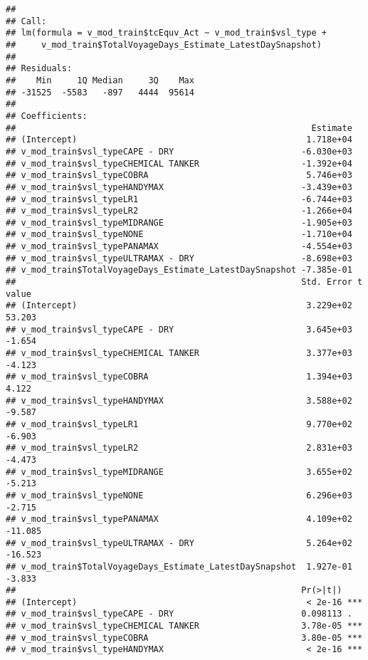 \documentclass[]{article}
\begin{document}
\begin{verbatim}
## 
## Call:
## lm(formula = v_mod_train$tcEquv_Act ~ v_mod_train$vsl_type + 
##     v_mod_train$TotalVoyageDays_Estimate_LatestDaySnapshot)
## 
## Residuals:
##    Min     1Q Median     3Q    Max 
## -31525  -5583   -897   4444  95614 
## 
## Coefficients:
##                                                          Estimate
## (Intercept)                                             1.718e+04
## v_mod_train$vsl_typeCAPE - DRY                         -6.030e+03
## v_mod_train$vsl_typeCHEMICAL TANKER                    -1.392e+04
## v_mod_train$vsl_typeCOBRA                               5.746e+03
## v_mod_train$vsl_typeHANDYMAX                           -3.439e+03
## v_mod_train$vsl_typeLR1                                -6.744e+03
## v_mod_train$vsl_typeLR2                                -1.266e+04
## v_mod_train$vsl_typeMIDRANGE                           -1.905e+03
## v_mod_train$vsl_typeNONE                               -1.710e+04
## v_mod_train$vsl_typePANAMAX                            -4.554e+03
## v_mod_train$vsl_typeULTRAMAX - DRY                     -8.698e+03
## v_mod_train$TotalVoyageDays_Estimate_LatestDaySnapshot -7.385e-01
##                                                        Std. Error t value
## (Intercept)                                             3.229e+02  53.203
## v_mod_train$vsl_typeCAPE - DRY                          3.645e+03  -1.654
## v_mod_train$vsl_typeCHEMICAL TANKER                     3.377e+03  -4.123
## v_mod_train$vsl_typeCOBRA                               1.394e+03   4.122
## v_mod_train$vsl_typeHANDYMAX                            3.588e+02  -9.587
## v_mod_train$vsl_typeLR1                                 9.770e+02  -6.903
## v_mod_train$vsl_typeLR2                                 2.831e+03  -4.473
## v_mod_train$vsl_typeMIDRANGE                            3.655e+02  -5.213
## v_mod_train$vsl_typeNONE                                6.296e+03  -2.715
## v_mod_train$vsl_typePANAMAX                             4.109e+02 -11.085
## v_mod_train$vsl_typeULTRAMAX - DRY                      5.264e+02 -16.523
## v_mod_train$TotalVoyageDays_Estimate_LatestDaySnapshot  1.927e-01  -3.833
##                                                        Pr(>|t|)    
## (Intercept)                                             < 2e-16 ***
## v_mod_train$vsl_typeCAPE - DRY                         0.098113 .  
## v_mod_train$vsl_typeCHEMICAL TANKER                    3.78e-05 ***
## v_mod_train$vsl_typeCOBRA                              3.80e-05 ***
## v_mod_train$vsl_typeHANDYMAX                            < 2e-16 ***

\end{verbatim}
\end{document}
